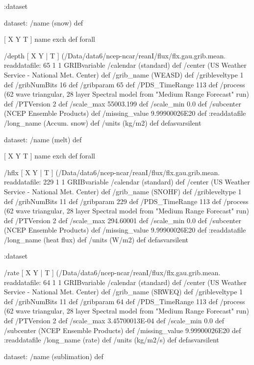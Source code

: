 \begin{ingrid}
  :dataset

  dataset: /name (snow) def

   [ X Y T ] { name exch def } forall

   /depth { [ X Y | T ] (/Data/data6/ncep-ncar/reanI/flux/flx.gau.grib.mean.%
   readdatafile:
   65 1 1 GRIBvariable
   /calendar (standard) def
   /center (US Weather Service - National Met. Center) def
   /grib_name (WEASD) def
   /gribleveltype 1 def
   /gribNumBits 16 def
   /gribparam 65 def
   /PDS_TimeRange 113 def
   /process (62 wave triangular, 28 layer Spectral model from "Medium Range Forecast" run) def
   /PTVersion 2 def
   /scale_max 55003.199 def
   /scale_min 0.0 def
   /subcenter (NCEP Ensemble Products) def
   /missing_value 9.99900026E20 def
   :readdatafile
   /long_name (Accum. snow) def
   /units (kg/m2) def
   } defasvarsilent

   dataset: /name (melt) def
 
    [ X Y T ] { name exch def } forall

    /hflx { [ X Y | T ] (/Data/data6/ncep-ncar/reanI/flux/flx.gau.grib.mean.%
    readdatafile:
    229 1 1 GRIBvariable
    /calendar (standard) def
    /center (US Weather Service - National Met. Center) def
    /grib_name (SNOHF) def
    /gribleveltype 1 def
    /gribNumBits 11 def
    /gribparam 229 def
    /PDS_TimeRange 113 def
    /process (62 wave triangular, 28 layer Spectral model from "Medium Range Forecast" run) def
    /PTVersion 2 def
    /scale_max 294.60001 def
    /scale_min 0.0 def
    /subcenter (NCEP Ensemble Products) def
    /missing_value 9.99900026E20 def
    :readdatafile
    /long_name (heat flux) def
    /units (W/m2) def
    } defasvarsilent
 
   :dataset

   /rate { [ X Y | T ] (/Data/data6/ncep-ncar/reanI/flux/flx.gau.grib.mean.%
   readdatafile:
   64 1 1 GRIBvariable
   /calendar (standard) def
   /center (US Weather Service - National Met. Center) def
   /grib_name (SRWEQ) def
   /gribleveltype 1 def
   /gribNumBits 11 def
   /gribparam 64 def
   /PDS_TimeRange 113 def
   /process (62 wave triangular, 28 layer Spectral model from "Medium Range Forecast" run) def
   /PTVersion 2 def
   /scale_max 3.45700013E-04 def
   /scale_min 0.0 def
   /subcenter (NCEP Ensemble Products) def
   /missing_value 9.99900026E20 def
   :readdatafile
   /long_name (rate) def
   /units (kg/m2/s) def
   } defasvarsilent

   dataset: /name (sublimation) def
 

\end{ingrid}
